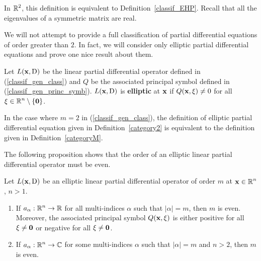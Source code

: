In $\displaystyle \mathbb{R}^2$, this definition is equivalent to
Definition~\ref{classif_EHP}.  Recall that all the eigenvalues of a
symmetric matrix are real.

We will not attempt to provide a full classification of partial
differential equations of order greater than $2$.   In fact, we will
consider only elliptic partial differential equations and 
prove one nice result about them.

\begin{defn}\label{categoryM}
Let $L(\mathbf{x}, \operatorname{D})$ be the linear partial differential operator
defined in (\ref{classif_gen_class}) and $Q$ be the associated principal
symbol defined in (\ref{classif_gen_princ_symb}).
$L(\mathbf{x}, \operatorname{D})$ is
{\bfseries elliptic}
at $\mathbf{x}$ if $\displaystyle Q(\mathbf{x}, \mathbf{\xi}) \neq 0$ for all
$\displaystyle \mathbf{\xi} \in \mathbb{R}^n\setminus \{\mathbf{0}\}$.
\end{defn}

In the case where $m=2$ in (\ref{classif_gen_class}), the definition of
elliptic partial differential equation given in
Definition~\ref{category2} is equivalent to
the definition given in Definition~\ref{categoryM}.

The following proposition shows that the order of an elliptic linear
partial differential operator must be even.

\begin{prop} \label{classif_ell_even}
Let $L(\mathbf{x}, \operatorname{D})$ be an elliptic linear partial differential
operator of order $m$ at $\displaystyle \mathbf{x} \in \mathbb{R}^n$, $n>1$.
\begin{enumerate}
\item If $\displaystyle a_\alpha:\mathbb{R}^n \rightarrow \mathbb{R}$ for all
multi-indices $\alpha$ such that $|\alpha|=m$, then $m$ is even.
Moreover, the associated principal symbol $Q(\mathbf{x}, \mathbf{\xi})$ is
either positive for all $\mathbf{\xi} \neq \mathbf{0}$ or negative for all
$\mathbf{\xi} \neq \mathbf{0}$.
\item If $\displaystyle a_\alpha:\mathbb{R}^n \rightarrow \mathbb{C}$ for some multi-indices
$\alpha$ such that $|\alpha|=m$ and $n>2$, then $m$ is even.
\end{enumerate}
\end{prop}

